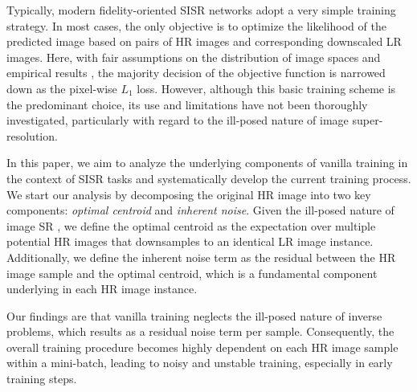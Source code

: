 \documentclass[letterpaper]{article} %
\begin{document}
Typically, modern fidelity-oriented SISR networks adopt a very simple training strategy. In most cases, the only objective is to optimize the likelihood of the predicted image based on pairs of HR images and corresponding downscaled LR images. Here, with fair assumptions on the distribution of image spaces and empirical results \cite{SISR2_EDSR}, the majority decision of the objective function is narrowed down as the pixel-wise $L_1$ loss. However, although this basic training scheme is the predominant choice, its use and limitations have not been thoroughly investigated, particularly with regard to the ill-posed nature of image super-resolution.

In this paper, we aim to analyze the underlying components of vanilla training in the context of SISR tasks and systematically develop the current training process. We start our analysis by decomposing the original HR image into two key components: \textit{optimal centroid} and \textit{inherent noise}. Given the ill-posed nature of image SR  \cite{hyun2020varsr, SISR9_SRFlow}, we define the optimal centroid as the expectation over multiple potential HR images that downsamples to an identical LR image instance. Additionally, we define the inherent noise term as the residual between the HR image sample and the optimal centroid, which is a fundamental component underlying in each HR image instance.

Our findings are that vanilla training neglects the ill-posed nature of inverse problems, which results as a residual noise term per sample.
Consequently, the overall training procedure becomes highly dependent on each HR image sample within a mini-batch, leading to noisy and unstable training, especially in early training steps.
\end{document}
